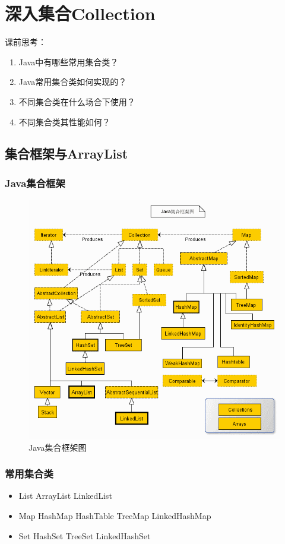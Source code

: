 \chapter{深入集合Collection}
课前思考：
\begin{enumerate}
	\item Java中有哪些常用集合类？
	\item Java常用集合类如何实现的？
	\item 不同集合类在什么场合下使用？
	\item 不同集合类其性能如何？
\end{enumerate}
\section{集合框架与ArrayList}
\subsection{Java集合框架}
\begin{figure}[!h]
	\centering
	\includegraphics[width=\textwidth]{image/collection.png}
	\caption{Java集合框架图}
\end{figure}
\subsection{常用集合类}
\begin{itemize}
	\item List
	\subitem ArrayList
	\subitem LinkedList
	\item Map
	\subitem HashMap
	\subitem HashTable
	\subitem TreeMap
	\subitem LinkedHashMap
	\item Set
	\subitem HashSet
	\subitem TreeSet
	\subitem LinkedHashSet
\end{itemize}
